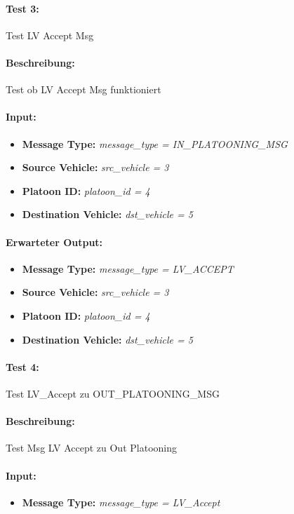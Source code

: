 \documentclass[a4paper, 12pt, titlepage]{scrartcl}
\begin{document}
{			\paragraph{Test 3:}{Test LV Accept Msg}
			\paragraph{Beschreibung:} Test ob LV Accept Msg funktioniert
			\paragraph{Input:}
			\begin{itemize} \itemsep-0.5em
				\item \textbf{Message Type:} \emph{message\_type = IN\_PLATOONING\_MSG}
				\item \textbf{Source Vehicle:} \emph{src\_vehicle = 3}
				\item \textbf{Platoon ID:} \emph{platoon\_id = 4}
				\item \textbf{Destination Vehicle:} \emph{dst\_vehicle = 5}
			\end{itemize}
			\paragraph{Erwarteter Output:}
			\begin{itemize} \itemsep-0.5em
				\item \textbf{Message Type:} \emph{message\_type = LV\_ACCEPT}
				\item \textbf{Source Vehicle:} \emph{src\_vehicle = 3}
				\item \textbf{Platoon ID:} \emph{platoon\_id = 4}
				\item \textbf{Destination Vehicle:} \emph{dst\_vehicle = 5}
			\end{itemize}	
			
			\paragraph{Test 4:}{Test LV\_Accept zu OUT\_PLATOONING\_MSG}
			\paragraph{Beschreibung:} Test Msg LV Accept zu Out Platooning
			\paragraph{Input:}
			\begin{itemize} \itemsep-0.5em
				\item \textbf{Message Type:} \emph{message\_type = LV\_Accept}


\end{itemize}}
\end{document}
